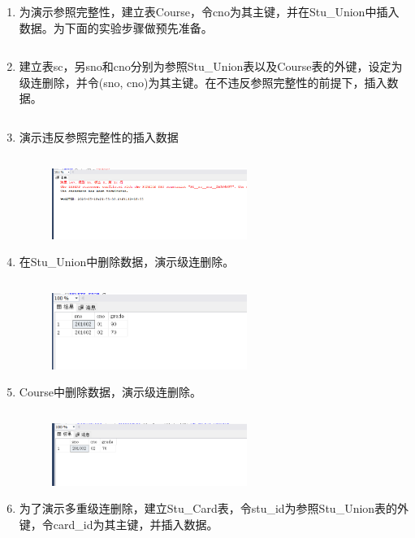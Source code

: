 \documentclass[a4paper,twoside]{article}
\begin{document}
\begin{spacing}{1.2}
\begin{enumerate}
\item 为演示参照完整性，建立表Course，令cno为其主键，并在Stu\_Union中插入数据。为下面的实验步骤做预先准备。
\inputminted[firstline=1,lastline=13]{sql}{../code/2.sql}
\item 建立表sc，另sno和cno分别为参照Stu\_Union表以及Course表的外键，设定为级连删除，并令(sno, cno)为其主键。在不违反参照完整性的前提下，插入数据。
\inputminted[firstline=14,lastline=28]{sql}{../code/2.sql}
\item 演示违反参照完整性的插入数据
\inputminted[firstline=31,lastline=32]{sql}{../code/2.sql}
\begin{figure}[H]
  \centering
  \includegraphics[width=0.6\textwidth]{5.png}
\end{figure}
\item 在Stu\_Union中删除数据，演示级连删除。
\inputminted[firstline=36,lastline=37]{sql}{../code/2.sql}
\begin{figure}[H]
  \centering
  \includegraphics[width=0.6\textwidth]{6.png}
\end{figure}
\item Course中删除数据，演示级连删除。
\inputminted[firstline=42,lastline=44]{sql}{../code/2.sql}
\begin{figure}[H]
  \centering
  \includegraphics[width=0.6\textwidth]{7.png}
\end{figure}
\item 为了演示多重级连删除，建立Stu\_Card表，令stu\_id为参照Stu\_Union表的外键，令card\_id为其主键，并插入数据。
\inputminted[firstline=49,lastline=59]{sql}{../code/2.sql}

\end{enumerate}
\end{spacing}
\end{document}
